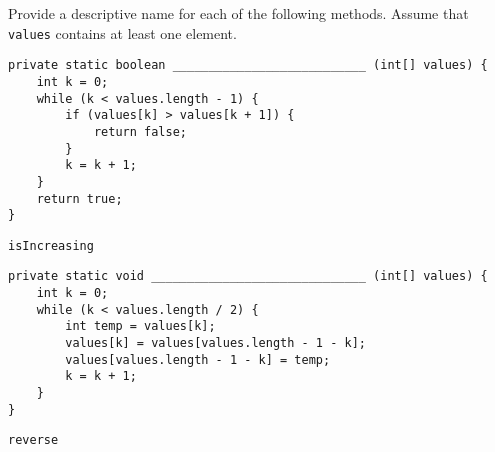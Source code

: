 \question Provide a descriptive name for each of the following methods. Assume that \texttt{values} contains at least one element.

\begin{lstlisting}
private static boolean ___________________________ (int[] values) {
    int k = 0;
    while (k < values.length - 1) {
        if (values[k] > values[k + 1]) {
            return false;
        }
        k = k + 1;
    }
    return true;
}
\end{lstlisting}

\begin{solution}
\texttt{isIncreasing}
\end{solution}

\begin{lstlisting}
private static void ______________________________ (int[] values) {
    int k = 0;
    while (k < values.length / 2) {
        int temp = values[k];
        values[k] = values[values.length - 1 - k];
        values[values.length - 1 - k] = temp;
        k = k + 1;
    }
}
\end{lstlisting}

\begin{solution}
\texttt{reverse}
\end{solution}
